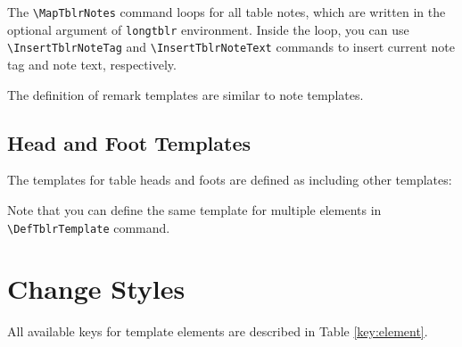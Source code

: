 \documentclass[oneside]{book}
\begin{document}
The \verb!\MapTblrNotes! command loops for all table notes,
which are written in the optional argument of \verb!longtblr! environment.
Inside the loop, you can use \verb!\InsertTblrNoteTag! and \verb!\InsertTblrNoteText!
commands to insert current note tag and note text, respectively.

The definition of remark templates are similar to note templates.
\nopagebreak
\begin{codehigh}
\end{codehigh}
\begin{codehigh}
\end{codehigh}

\subsection{Head and Foot Templates}

The templates for table heads and foots are defined as including other templates:

\begin{codehigh}
\end{codehigh}

Note that you can define the same template for multiple elements in \verb!\DefTblrTemplate! command.

\section{Change Styles}

All available keys for template elements are described in Table \ref{key:element}.
\end{document}
